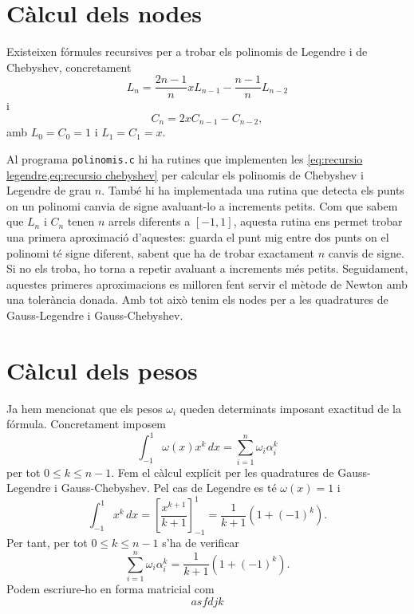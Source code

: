 \documentclass[12pt]{article}
\numberwithin{table}{section}
\numberwithin{figure}{section}
\numberwithin{equation}{section}
\begin{document}
\section{Càlcul dels nodes}

Existeixen fórmules recursives per a trobar els polinomis de Legendre i de Chebyshev, concretament
\begin{equation} \label{eq:recursio legendre}
	L_n = \frac{2n-1}{n}xL_{n-1} - \frac{n-1}{n}L_{n-2}
\end{equation}
i
\begin{equation} \label{eq:recursio chebyshev}
	C_n = 2xC_{n-1} - C_{n-2},
\end{equation}
amb \( L_0 = C_0 = 1 \) i \( L_1 = C_1 = x \). 

Al programa \texttt{polinomis.c} hi ha rutines que implementen les \cref{eq:recursio legendre,eq:recursio chebyshev} per calcular els polinomis de Chebyshev i Legendre de grau \( n \). També hi ha implementada una rutina que detecta els punts on un polinomi canvia de signe avaluant-lo a increments petits. Com que sabem que \( L_n \) i \( C_n \) tenen \( n \) arrels diferents a \( [-1,1] \), aquesta rutina ens permet trobar una primera aproximació d'aquestes: guarda el punt mig entre dos punts on el polinomi té signe diferent, sabent que ha de trobar exactament \( n \) canvis de signe. Si no els troba, ho torna a repetir avaluant a increments més petits. Seguidament, aquestes primeres aproximacions es milloren fent servir el mètode de Newton amb una tolerància donada. Amb tot això tenim els nodes per a les quadratures de Gauss-Legendre i Gauss-Chebyshev.     

\section{Càlcul dels pesos}

Ja hem mencionat que els pesos \( \omega_i \) queden determinats imposant exactitud de la fórmula. Concretament imposem
\begin{equation*}
	\int_{-1}^{1}\omega(x) x^k \,dx = \sum_{i = 1}^n \omega_i \alpha_i^k
\end{equation*}
per tot \( 0 \leq k \leq n-1 \). Fem el càlcul explícit per les quadratures de Gauss-Legendre i Gauss-Chebyshev. Pel cas de Legendre es té \( \omega(x) = 1 \) i 
\begin{equation*}
	\int_{-1}^{1}x^k\,dx = \left[\frac{x^{k+1}}{k+1}\right]^{1}_{-1} = \frac{1}{k+1}\left(1 + (-1)^k\right). 
\end{equation*}
Per tant, per tot \( 0 \leq k \leq n-1 \) s'ha de verificar 
\begin{equation*}
	\sum_{i = 1}^n \omega_i \alpha_i^k = \frac{1}{k+1}\left(1 + (-1)^k\right). 
\end{equation*}
Podem escriure-ho en forma matricial com
\begin{equation*}
asfdjk
\end{equation*}
\end{document}
